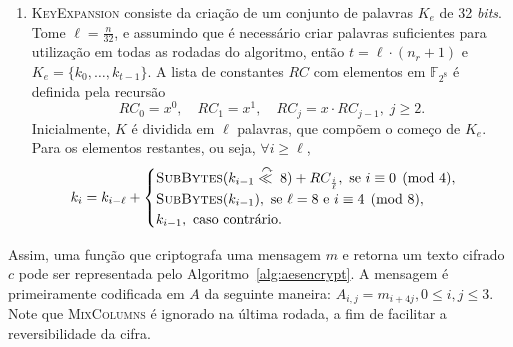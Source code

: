 \documentclass{ufsctex/ufsctex}
\begin{document}
\begin{enumerate}[label=\roman*.]
  \item \textsc{KeyExpansion} consiste da criação de um conjunto de palavras
      $K_{e}$ de 32 \emph{bits}. Tome $\ell = \frac{n}{32}$, e assumindo que é
        necessário criar palavras suficientes para utilização em todas as
        rodadas do algoritmo, então $t = \ell \cdot (n_{r} + 1)$ e $K_{e} =
        \{k_{0}, \dots, k_{t - 1}\}$. A lista de constantes $RC$ com elementos
        em $\mathbb{F}_{2^{8}}$ é definida pela recursão
        \begin{equation}
          RC_{0} = x^{0}, \quad RC_{1} = x^{1}, \quad
          RC_{j} = x \cdot RC_{j - 1}, \; j \geq 2.
        \end{equation}
        Inicialmente, $K$ é dividida em $\ell$ palavras, que compõem o começo
        de $K_{e}$. Para os elementos restantes, ou seja, $\forall i \geq \ell$,
        \begin{equation}
          k_{i} = k_{i - \ell} +
          \begin{cases}
            \textsc{SubBytes}(k_{i - 1}
              \stackrel{\curvearrowright}{\ll{}} 8) + RC_{\frac{i}{\ell}},
              \text{ se } i \equiv 0 \pmod{4}, \\
            \textsc{SubBytes}(k_{i - 1}),
              \text{ se } \ell = 8 \text { e } i \equiv 4 \pmod{8}, \\
            k_{i - 1}, \text{ caso contrário.}
          \end{cases}
        \end{equation}

\end{enumerate}

Assim, uma função que criptografa uma mensagem $m$ e retorna um texto cifrado
$c$ pode ser representada pelo Algoritmo~\ref{alg:aesencrypt}. A mensagem é
primeiramente codificada em $A$ da seguinte maneira: $A_{i, j} = m_{i + 4j}, 0
\leq i, j \leq 3$. Note que \textsc{MixColumns} é ignorado na última rodada, a
fim de facilitar a reversibilidade da cifra.
\end{document}
